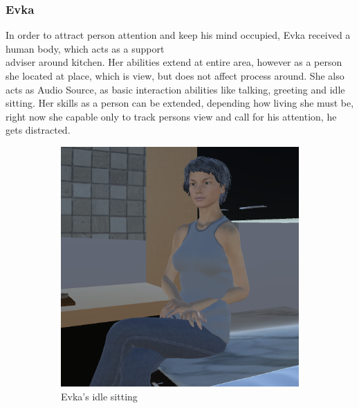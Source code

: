 \documentclass[18pt]{article}
\numberwithin{equation}{section} %
\numberwithin{figure}{section} %
\numberwithin{table}{section} %
\begin{document}
	\subsubsection{Evka}
		In order to attract person attention and keep his mind occupied, Evka received a human body, which acts as a support\\adviser around kitchen. Her abilities extend at entire area, however as a person she located at place, which is  view, but does not affect process around. She also acts as Audio Source, as basic interaction abilities like talking, greeting and idle sitting. Her skills as a person can be extended, depending how living she must be, right now she capable only to track persons view and call for his attention, he gets distracted. \\
		\begin{figure}[H]
			\centering
			\begin{subfigure}{0.4\textwidth}
				\centering
				\includegraphics[width=1\linewidth]{images/Evka_sit_1}
				\caption{Evka's idle sitting}
			\end{subfigure}
			\begin{subfigure}{0.4\textwidth}
				\centering

\end{subfigure}
\end{figure}
\end{document}
